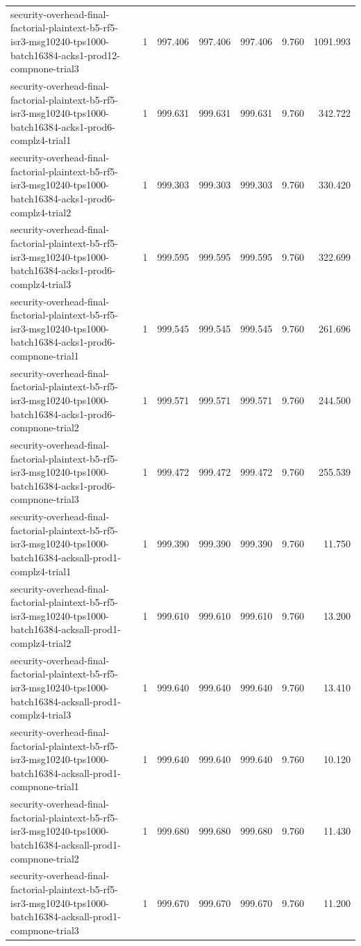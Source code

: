 \begin{tabular}{lrrrrrr}
security-overhead-final-factorial-plaintext-b5-rf5-isr3-msg10240-tps1000-batch16384-acks1-prod12-compnone-trial3 & 1 & 997.406 & 997.406 & 997.406 & 9.760 & 1091.993 \\
security-overhead-final-factorial-plaintext-b5-rf5-isr3-msg10240-tps1000-batch16384-acks1-prod6-complz4-trial1 & 1 & 999.631 & 999.631 & 999.631 & 9.760 & 342.722 \\
security-overhead-final-factorial-plaintext-b5-rf5-isr3-msg10240-tps1000-batch16384-acks1-prod6-complz4-trial2 & 1 & 999.303 & 999.303 & 999.303 & 9.760 & 330.420 \\
security-overhead-final-factorial-plaintext-b5-rf5-isr3-msg10240-tps1000-batch16384-acks1-prod6-complz4-trial3 & 1 & 999.595 & 999.595 & 999.595 & 9.760 & 322.699 \\
security-overhead-final-factorial-plaintext-b5-rf5-isr3-msg10240-tps1000-batch16384-acks1-prod6-compnone-trial1 & 1 & 999.545 & 999.545 & 999.545 & 9.760 & 261.696 \\
security-overhead-final-factorial-plaintext-b5-rf5-isr3-msg10240-tps1000-batch16384-acks1-prod6-compnone-trial2 & 1 & 999.571 & 999.571 & 999.571 & 9.760 & 244.500 \\
security-overhead-final-factorial-plaintext-b5-rf5-isr3-msg10240-tps1000-batch16384-acks1-prod6-compnone-trial3 & 1 & 999.472 & 999.472 & 999.472 & 9.760 & 255.539 \\
security-overhead-final-factorial-plaintext-b5-rf5-isr3-msg10240-tps1000-batch16384-acksall-prod1-complz4-trial1 & 1 & 999.390 & 999.390 & 999.390 & 9.760 & 11.750 \\
security-overhead-final-factorial-plaintext-b5-rf5-isr3-msg10240-tps1000-batch16384-acksall-prod1-complz4-trial2 & 1 & 999.610 & 999.610 & 999.610 & 9.760 & 13.200 \\
security-overhead-final-factorial-plaintext-b5-rf5-isr3-msg10240-tps1000-batch16384-acksall-prod1-complz4-trial3 & 1 & 999.640 & 999.640 & 999.640 & 9.760 & 13.410 \\
security-overhead-final-factorial-plaintext-b5-rf5-isr3-msg10240-tps1000-batch16384-acksall-prod1-compnone-trial1 & 1 & 999.640 & 999.640 & 999.640 & 9.760 & 10.120 \\
security-overhead-final-factorial-plaintext-b5-rf5-isr3-msg10240-tps1000-batch16384-acksall-prod1-compnone-trial2 & 1 & 999.680 & 999.680 & 999.680 & 9.760 & 11.430 \\
security-overhead-final-factorial-plaintext-b5-rf5-isr3-msg10240-tps1000-batch16384-acksall-prod1-compnone-trial3 & 1 & 999.670 & 999.670 & 999.670 & 9.760 & 11.200 \\

\end{tabular}
